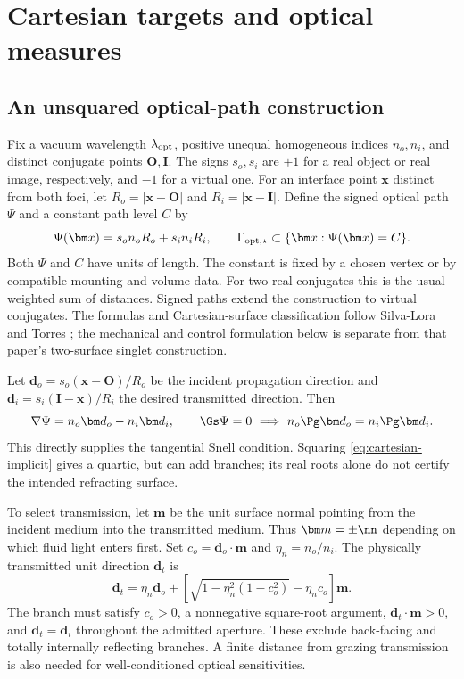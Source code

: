 \section{Cartesian targets and optical measures}\label{sec:optics}

\subsection{An unsquared optical-path construction}
Fix a vacuum wavelength $\lambda_{\rm opt}$, positive unequal homogeneous indices
$n_o,n_i$, and distinct conjugate points $\bm O,\bm I$. The signs $s_o,s_i$ are
$+1$ for a real object or real image, respectively, and $-1$ for a virtual one.
For an interface point $\bm x$ distinct from both foci, let
$R_o=|\bm x-\bm O|$ and $R_i=|\bm x-\bm I|$. Define the signed optical path
$\Psi$ and a constant path level $C$ by
\begin{equation}
 \Psi(\bm x)=s_o n_oR_o+s_i n_iR_i,\qquad
 \Gamma_{\rm opt,\star}\subset\{\bm x:\Psi(\bm x)=C\}.
 \label{eq:cartesian-implicit}
\end{equation}
Both $\Psi$ and $C$ have units of length. The constant is fixed by a chosen
vertex or by compatible mounting and volume data. For two real conjugates this
is the usual weighted sum of distances. Signed paths extend the construction to
virtual conjugates. The formulas and Cartesian-surface classification follow
Silva-Lora and Torres \cite{silva2020}; the mechanical and control formulation
below is separate from that paper's two-surface singlet construction.

Let $\bm d_o=s_o(\bm x-\bm O)/R_o$ be the incident propagation direction and
$\bm d_i=s_i(\bm I-\bm x)/R_i$ the desired transmitted direction. Then
\begin{equation}
 \nabla\Psi=n_o\bm d_o-n_i\bm d_i,\qquad
 \Gs\Psi=0\ \Longrightarrow\ n_o\Pg\bm d_o=n_i\Pg\bm d_i.
 \label{eq:fermat-snell}
\end{equation}
This directly supplies the tangential Snell condition. Squaring
\cref{eq:cartesian-implicit} gives a quartic, but can add branches; its real
roots alone do not certify the intended refracting surface.

To select transmission, let $\bm m$ be the unit surface normal pointing from the
incident medium into the transmitted medium. Thus $\bm m=\pm\nn$ depending on
which fluid light enters first. Set $c_o=\bm d_o\cdot\bm m$ and
$\eta_n=n_o/n_i$. The physically transmitted unit direction $\bm d_t$ is
\begin{equation}
 \bm d_t=\eta_n\bm d_o+
 \left[\sqrt{1-\eta_n^2(1-c_o^2)}-\eta_n c_o\right]\bm m.
 \label{eq:snell-vector}
\end{equation}
The branch must satisfy $c_o>0$, a nonnegative square-root argument,
$\bm d_t\cdot\bm m>0$, and $\bm d_t=\bm d_i$ throughout the admitted aperture.
These exclude back-facing and totally internally reflecting branches. A finite
distance from grazing transmission is also needed for well-conditioned optical
sensitivities.

